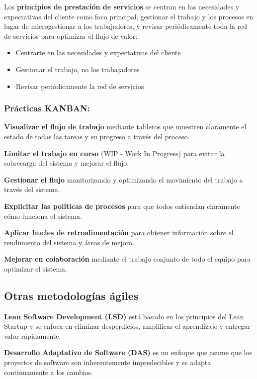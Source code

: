 \documentclass[a4paper,11pt]{report}
\begin{document}
    Los \textbf{principios de prestación de servicios} se centran en las necesidades y expectativas del cliente como foco principal, gestionar el trabajo y los procesos en lugar de microgestionar a los trabajadores, y revisar periódicamente toda la red de servicios para optimizar el flujo de valor:
    \begin{itemize}
        \item Centrarte en las necesidades y expectativas del cliente
        \item  Gestionar el trabajo, no los trabajadores
        \item Revisar periódicamente la red de servicios
    \end{itemize}

    \subsubsection{Prácticas KANBAN:}

    \textbf{Visualizar el flujo de trabajo} mediante tableros que muestren claramente el estado de todas las tareas y su progreso a través del proceso.

    \textbf{Limitar el trabajo en curso} (WIP - Work In Progress) para evitar la sobrecarga del sistema y mejorar el flujo.

    \textbf{Gestionar el flujo} monitorizando y optimizando el movimiento del trabajo a través del sistema.

    \textbf{Explicitar las políticas de procesos} para que todos entiendan claramente cómo funciona el sistema.

    \textbf{Aplicar bucles de retroalimentación} para obtener información sobre el rendimiento del sistema y áreas de mejora.

    \textbf{Mejorar en colaboración} mediante el trabajo conjunto de todo el equipo para optimizar el sistema.


    \subsection{Otras metodologías ágiles}\label{subsec:otras-metodologias-agiles}

    \textbf{Lean Software Development (LSD)} está basado en los principios del Lean Startup y se enfoca en eliminar desperdicios, amplificar el aprendizaje y entregar valor rápidamente.

    \textbf{Desarrollo Adaptativo de Software (DAS)} es un enfoque que asume que los proyectos de software son inherentemente impredecibles y se adapta continuamente a los cambios.
\end{document}
